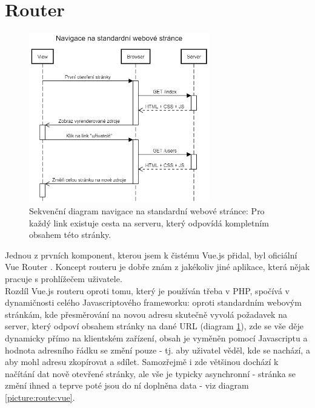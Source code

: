 \section{Router}

\begin{figure}[h]
\includegraphics[width=0.7\textwidth]{../png/diagrams/sequence-http-navigate.png}
\caption[Sekvenční diagram navigace na standardní webové stránce]{Sekvenční diagram navigace na standardní webové stránce: Pro každý link existuje cesta na serveru, který odpovídá kompletním obsahem této stránky.} \label{picture:route:http}
\end{figure}

Jednou z prvních komponent, kterou jsem k čistému Vue.js přidal, byl oficiální Vue Router \cite{vue-router}. Koncept routeru je dobře znám z jakékoliv jiné aplikace, která nějak pracuje s prohlížečem uživatele.\\
Rozdíl Vue.js routeru oproti tomu, který je používán třeba v PHP, spočívá v dynamičnosti celého Javascriptového frameworku: oproti standardním webovým stránkám, kde přesměrování na novou adresu skutečně vyvolá požadavek na server, který odpoví obsahem stránky na dané URL (diagram \ref{picture:route:http}), zde se vše děje dynamicky přímo na klientském zařízení, obsah je vyměněn pomocí Javascriptu a hodnota adresního řádku se změní pouze  - tj. aby uživatel věděl, kde se nachází, a aby mohl adresu zkopírovat a sdílet. Samozřejmě i zde většinou dochází k načítání dat nově otevřené stránky, ale vše je typicky asynchronní - stránka se změní ihned a teprve poté jsou do ní doplněna data - viz diagram \ref{picture:route:vue}.

